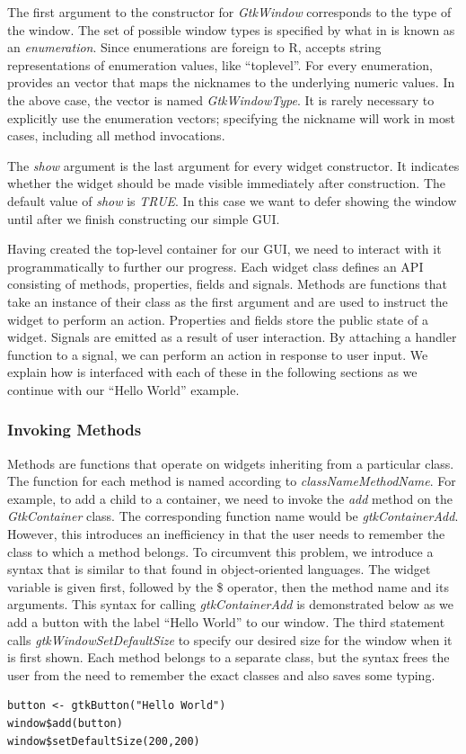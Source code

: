 \documentclass[article]{jss}
\begin{document}
The first argument to the constructor for \emph{GtkWindow} corresponds to the  
type of the window. The set of possible window types is specified by what in 
 is known as an \emph{enumeration}. Since enumerations are foreign 
to R,  accepts string representations of enumeration values, like 
``toplevel''. For every  enumeration,  provides an 
 vector that maps the nicknames to the underlying numeric values. 
In the above case, the vector is named \emph{GtkWindowType}. It is rarely 
necessary to explicitly use the enumeration vectors; specifying the nickname 
will work in most cases, including all method invocations.

The \emph{show} argument is the last argument for every widget constructor. It
indicates whether the widget should be made visible immediately after construction.
The default value of \emph{show} is \emph{TRUE}. In this case we want to
defer showing the window until after we finish constructing our simple GUI.

Having created the top-level container for our GUI, we need to interact with it
programmatically to further our progress. Each widget class defines an API 
consisting of methods, properties, fields and signals. Methods are functions 
that take an instance of their class as the first argument and are used to instruct the 
widget to perform an action. Properties and fields store the public state of a widget. 
Signals are emitted as a result of user interaction.
By attaching a handler function to a signal, we can perform an action in response
to user input. We explain how  is interfaced
with each of these in the following sections as we continue with our ``Hello World'' example.

\subsubsection{Invoking Methods}

Methods are functions that operate on widgets inheriting from a particular class.
The  function for each  method is named according to
\emph{classNameMethodName}. For example, to add a child to a container, we 
need to invoke the \emph{add} method on the \emph{GtkContainer} class. 
The corresponding function name would be \emph{gtkContainerAdd}. However, this 
introduces an inefficiency in that the user needs to remember the class to which
a method belongs. To circumvent this problem, we introduce a syntax that is similar
to that found in object-oriented languages. The widget
variable is given first, followed by the \$ operator, then the method
name and its arguments. This syntax for calling \emph{gtkContainerAdd} is demonstrated 
below as we add a button with the label ``Hello World'' to our window. The
third statement calls \emph{gtkWindowSetDefaultSize} to specify our desired
size for the window when it is first shown. Each method belongs to a separate
class, but the syntax frees the user from the need to remember the exact classes
and also saves some typing.
\begin{verbatim}
button <- gtkButton("Hello World")
window$add(button)
window$setDefaultSize(200,200)
\end{verbatim}
\end{document}
